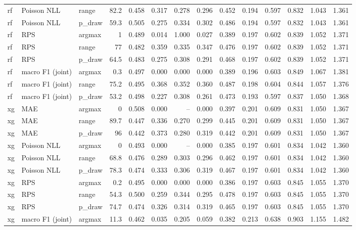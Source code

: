 \begin{tabular}{lllrrrrrrrrrrr}
rf & Poisson NLL & range & 82.2 & 0.458 & 0.317 & 0.278 & 0.296 & 0.452 & 0.194 & 0.597 & 0.832 & 1.043 & 1.361\\
rf & Poisson NLL & p\_draw & 59.3 & 0.505 & 0.275 & 0.334 & 0.302 & 0.486 & 0.194 & 0.597 & 0.832 & 1.043 & 1.361\\
rf & RPS & argmax & 1 & 0.489 & 0.014 & 1.000 & 0.027 & 0.389 & 0.197 & 0.602 & 0.839 & 1.052 & 1.371\\
rf & RPS & range & 77 & 0.482 & 0.359 & 0.335 & 0.347 & 0.476 & 0.197 & 0.602 & 0.839 & 1.052 & 1.371\\
rf & RPS & p\_draw & 64.5 & 0.483 & 0.275 & 0.308 & 0.291 & 0.468 & 0.197 & 0.602 & 0.839 & 1.052 & 1.371\\
rf & macro F1 (joint) & argmax & 0.3 & 0.497 & 0.000 & 0.000 & 0.000 & 0.389 & 0.196 & 0.603 & 0.849 & 1.067 & 1.381\\
rf & macro F1 (joint) & range & 75.2 & 0.495 & 0.368 & 0.352 & 0.360 & 0.487 & 0.198 & 0.604 & 0.844 & 1.057 & 1.376\\
rf & macro F1 (joint) & p\_draw & 53.2 & 0.498 & 0.227 & 0.308 & 0.261 & 0.473 & 0.193 & 0.597 & 0.837 & 1.050 & 1.368\\
xg & MAE & argmax & 0 & 0.508 & 0.000 & -- & 0.000 & 0.397 & 0.201 & 0.609 & 0.831 & 1.050 & 1.367\\
xg & MAE & range & 89.7 & 0.447 & 0.336 & 0.270 & 0.299 & 0.445 & 0.201 & 0.609 & 0.831 & 1.050 & 1.367\\
xg & MAE & p\_draw & 96 & 0.442 & 0.373 & 0.280 & 0.319 & 0.442 & 0.201 & 0.609 & 0.831 & 1.050 & 1.367\\
xg & Poisson NLL & argmax & 0 & 0.493 & 0.000 & -- & 0.000 & 0.385 & 0.197 & 0.601 & 0.834 & 1.042 & 1.360\\
xg & Poisson NLL & range & 68.8 & 0.476 & 0.289 & 0.303 & 0.296 & 0.462 & 0.197 & 0.601 & 0.834 & 1.042 & 1.360\\
xg & Poisson NLL & p\_draw & 78.3 & 0.474 & 0.333 & 0.306 & 0.319 & 0.467 & 0.197 & 0.601 & 0.834 & 1.042 & 1.360\\
xg & RPS & argmax & 0.2 & 0.495 & 0.000 & 0.000 & 0.000 & 0.386 & 0.197 & 0.603 & 0.845 & 1.055 & 1.370\\
xg & RPS & range & 54.3 & 0.500 & 0.259 & 0.344 & 0.295 & 0.478 & 0.197 & 0.603 & 0.845 & 1.055 & 1.370\\
xg & RPS & p\_draw & 74.7 & 0.474 & 0.326 & 0.314 & 0.319 & 0.465 & 0.197 & 0.603 & 0.845 & 1.055 & 1.370\\
xg & macro F1 (joint) & argmax & 11.3 & 0.462 & 0.035 & 0.205 & 0.059 & 0.382 & 0.213 & 0.638 & 0.903 & 1.155 & 1.482\\

\end{tabular}
